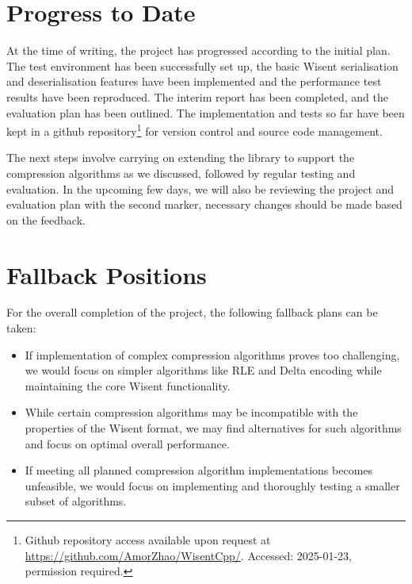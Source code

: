 \vspace{1.2em}

\section{Progress to Date}

At the time of writing, the project has progressed according to the initial plan. The test environment has been successfully set up, the basic Wisent serialisation and deserialisation features have been implemented and the performance test results have been reproduced. The interim report has been completed, and the evaluation plan has been outlined. The implementation and tests so far have been kept in a github repository\footnote{Github repository access available upon request at \url{https://github.com/AmorZhao/WisentCpp/}. Accessed: 2025-01-23, permission required.} for version control and source code management.

The next steps involve carrying on extending the library to support the compression algorithms as we discussed, followed by regular testing and evaluation. In the upcoming few days, we will also be reviewing the project and evaluation plan with the second marker, necessary changes should be made based on the feedback. 


\section{Fallback Positions}

For the overall completion of the project, the following fallback plans can be taken: 

\begin{itemize}
   \item If implementation of complex compression algorithms proves too challenging, we would focus on simpler algorithms like RLE and Delta encoding while maintaining the core Wisent functionality.
   
   \item While certain compression algorithms may be incompatible with the properties of the Wisent format, we may find alternatives for such algorithms and focus on optimal overall performance.
   
   \item If meeting all planned compression algorithm implementations becomes unfeasible, we would focus on implementing and thoroughly testing a smaller subset of algorithms.
\end{itemize}


